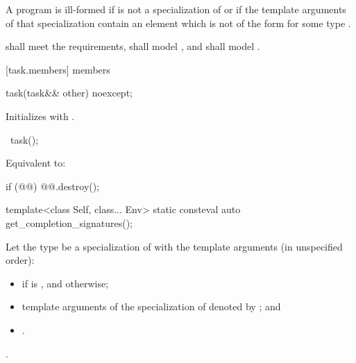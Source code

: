 \pnum
 A program is ill-formed if  is not a
specialization of 
or if the template arguments of that specialization
contain an element which is not of the form
 for some type .

\pnum
{} shall meet the  requirements,
 shall model , and
 shall model .

[task.members]{ members}

%
\begin{itemdecl}
task(task&& other) noexcept;
\end{itemdecl}
\begin{itemdescr}
\pnum
\effects
Initializes  with .
\end{itemdescr}

%
\begin{itemdecl}
~task();
\end{itemdecl}
\begin{itemdescr}
\pnum
\effects
Equivalent to:
\begin{codeblock}
if (@@)
  @@.destroy();
\end{codeblock}
\end{itemdescr}

%
\begin{itemdecl}
template<class Self, class... Env>
  static consteval auto get_completion_signatures();
\end{itemdecl}
\begin{itemdescr}
\pnum
Let the type  be a specialization
of 
with the template arguments (in unspecified order):
\begin{itemize}
\item
{} if  is ,
and  otherwise;
\item
template arguments of the specialization of
 denoted by ;
and
\item {}.
\end{itemize}

\pnum
\returns
{}.
\end{itemdescr}

